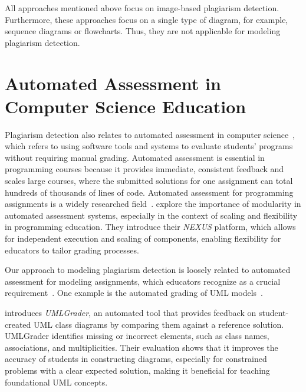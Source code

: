 All approaches mentioned above focus on image-based plagiarism detection. Furthermore, these approaches focus on a single type of diagram, for example, sequence diagrams or flowcharts. Thus, they are not applicable for modeling plagiarism detection.

\section{Automated Assessment in Computer Science Education}
Plagiarism detection also relates to automated assessment in computer science~\cite{mala-mutka2005}, which refers to using software tools and systems to evaluate students' programs without requiring manual grading.
Automated assessment is essential in programming courses because it provides immediate, consistent feedback and scales large courses, where the submitted solutions for one assignment can total hundreds of thousands of lines of code.
Automated assessment for programming assignments is a widely researched field~\cite{Messer2024, paiva2022, higgins2005, mala-mutka2005}.
%
\citet{zschaler2018} explore the importance of modularity in automated assessment systems, especially in the context of scaling and flexibility in programming education.
They introduce their \textit{NEXUS} platform, which allows for independent execution and scaling of components, enabling flexibility for educators to tailor grading processes.

Our approach to modeling plagiarism detection is loosely related to automated assessment for modeling assignments, which educators recognize as a crucial requirement~\cite{Kienzle2024}. One example is the automated grading of UML models~\cite{Bian2019, Bian2020, Boubekeur2020, Hasker2011}.

\citet{Hasker2011} introduces \textit{UMLGrader}, an automated tool that provides feedback on student-created UML class diagrams by comparing them against a reference solution. UMLGrader identifies missing or incorrect elements, such as class names, associations, and multiplicities. Their evaluation shows that it improves the accuracy of students in constructing diagrams, especially for constrained problems with a clear expected solution, making it beneficial for teaching foundational UML concepts.

